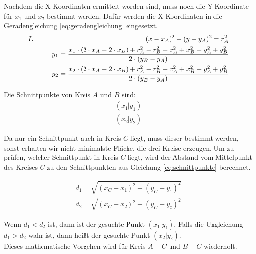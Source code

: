 Nachdem die X-Koordinaten ermittelt worden sind, muss noch die Y-Koordinate für $x_{1}$ und $x_{2}$ bestimmt werden. Dafür werden die X-Koordinaten in die Geradengleichung \ref{eq:geradengleichung} eingesetzt.
\begin{equation}\label{eq:y_errechnen}
\begin{split}
\RM{1} \hspace{5.7cm} (x-x_{A})^{2}+(y-y_{A})^{2} = r_{A}^{2} \\
\hspace{1cm} y_{1} = \frac{ x_{1} \cdot (2 \cdot x_{A} - 2 \cdot x_{B}) + r_{A}^{2} - r_{B}^{2} - x_{A}^{2} + x_{B}^{2} - y_{A}^{2} + y_{B}^{2} }{2 \cdot (y_{B} - y_{A})}
\\
\hspace{1cm} y_{2} = \frac{ x_{2} \cdot (2 \cdot x_{A} - 2 \cdot x_{B}) + r_{A}^{2} - r_{B}^{2} - x_{A}^{2} + x_{B}^{2} - y_{A}^{2} + y_{B}^{2} }{2 \cdot (y_{B} - y_{A})}
\end{split}
\end{equation}

Die Schnittpunkte von Kreis $A$ und $B$ sind:
\begin{equation}\label{eq:schnittpunkte}
\begin{split}
(x_{1} | y_{1})
\\
(x_{2} | y_{2})
\end{split}
\end{equation}

Da nur ein Schnittpunkt auch in Kreis $C$ liegt, muss dieser bestimmt werden, sonst erhalten wir nicht minimalste Fläche, die drei Kreise erzeugen. Um zu prüfen, welcher Schnittpunkt in Kreis $C$ liegt, wird der Abstand vom Mittelpunkt des Kreises $C$ zu den Schnittpunkten aus Gleichung \ref{eq:schnittpunkte} berechnet.

\begin{equation}\label{eq:schnittpunkt_der_im_kreis_liegt}
\begin{split}
d_{1} = \sqrt{(x_{C} - x_{1})^2 + (y_{C} - y_{1})^{2}}
\\
d_{2} = \sqrt{(x_{C} - x_{2})^2 + (y_{C} - y_{2})^{2}}
\end{split}
\end{equation}

Wenn $d_{1} < d_{2}$ ist, dann ist der gesuchte Punkt $(x_{1} | y_{1})$. Falls die Ungleichung $d_{1} > d_{2}$ wahr ist, dann heißt der gesuchte Punkt $(x_{2} | y_{2})$.
\\
Dieses mathematische Vorgehen wird für Kreis $A-C$ und $B-C$ wiederholt.

